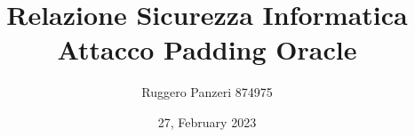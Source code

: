 \documentclass[a4paper, 12pt]{article}
\title{Relazione Sicurezza Informatica \\
    \large {Attacco Padding Oracle}}
\author{ \small Ruggero Panzeri 874975}
\date{\small 27, February 2023}
\begin{document}
\newcommand{\imagespace}{\vspace{0.4cm}}

\maketitle


\newpage

\tableofcontents

\newpage



        
\end{document}

